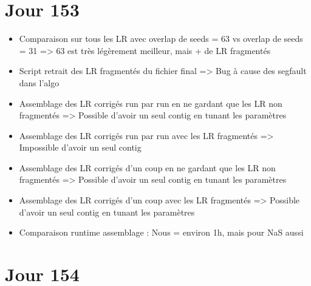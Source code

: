 \documentclass[12pt]{report}
\begin{document}
\section{Jour 153}

\begin{itemize}
	\item Comparaison sur tous les LR avec overlap de seeds = 63 vs overlap de seeds = 31 => 63 est très légèrement meilleur, mais + de LR fragmentés
	
	\item Script retrait des LR fragmentés du fichier final => Bug à cause des segfault dans l'algo
	
	\item Assemblage des LR corrigés run par run en ne gardant que les LR non fragmentés => Possible d'avoir un seul contig en tunant les paramètres
	
	\item Assemblage des LR corrigés run par run avec les LR fragmentés => Impossible d'avoir un seul contig
	
	\item Assemblage des LR corrigés d'un coup en ne gardant que les LR non fragmentés => Possible d'avoir un seul contig en tunant les paramètres
	
	\item Assemblage des LR corrigés d'un coup avec les LR fragmentés => Possible d'avoir un seul contig en tunant les paramètres
	
	\item Comparaison runtime assemblage : Nous = environ 1h, mais pour NaS aussi
\end{itemize}

\section{Jour 154}
\end{document}
